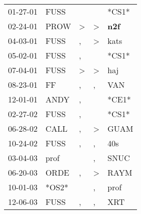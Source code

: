 \begin{supertabular}{p{0.07\textwidth}p{0.06\textwidth}p{0.02\textwidth}p{0.02\textwidth}p{0.06\textwidth}}
 01-27-01\textsuperscript{} &           FUSS\textsuperscript{} &                  &                  &                            *CS1* \\
 02-24-01\textsuperscript{} &           PROW\textsuperscript{} &     \textgreater &     \textgreater &   \textbf{n2f\textsuperscript{}} \\
 04-03-01\textsuperscript{} &           FUSS\textsuperscript{} &                , &     \textgreater &           kats\textsuperscript{} \\
 05-02-01\textsuperscript{} &           FUSS\textsuperscript{} &                , &                  &                            *CS1* \\
 07-04-01\textsuperscript{} &           FUSS\textsuperscript{} &     \textgreater &     \textgreater &            haj\textsuperscript{} \\
 08-23-01\textsuperscript{} &             FF\textsuperscript{} &                , &                , &            VAN\textsuperscript{} \\
 12-01-01\textsuperscript{} &           ANDY\textsuperscript{} &                , &                  &                            *CE1* \\
 02-27-02\textsuperscript{} &           FUSS\textsuperscript{} &                , &                  &                            *CS1* \\
 06-28-02\textsuperscript{} &           CALL\textsuperscript{} &                , &     \textgreater &           GUAM\textsuperscript{} \\
 10-24-02\textsuperscript{} &           FUSS\textsuperscript{} &                , &                , &            40s\textsuperscript{} \\
 03-04-03\textsuperscript{} &           prof\textsuperscript{} &                  &                , &           SNUC\textsuperscript{} \\
 06-20-03\textsuperscript{} &           ORDE\textsuperscript{} &                , &     \textgreater &           RAYM\textsuperscript{} \\
 10-01-03\textsuperscript{} &                            *OS2* &                  &                , &           prof\textsuperscript{} \\
 12-06-03\textsuperscript{} &           FUSS\textsuperscript{} &                , &                , &            XRT\textsuperscript{} \\

\end{supertabular}
